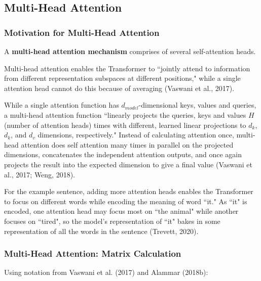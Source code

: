 \subsection{Multi-Head Attention}

\subsubsection{Motivation for Multi-Head Attention}


A \textbf{multi-head attention mechanism} comprises of several self-attention heads. 

Multi-head attention enables the Transformer to ``jointly attend to information from different representation subspaces at different positions," while a single attention head cannot do this because of averaging (Vaswani et al., 2017). 

While a single attention function has $d_{model}$-dimensional keys, values and queries, a multi-head attention function ``linearly projects the queries, keys and values $H$ (number of attention heads) times with different, learned linear projections to $d_k$, $d_k$, and $d_v$ dimensions, respectively." Instead of calculating attention once, multi-head attention does self attention many times in parallel on the projected dimensions, concatenates the independent attention outputs, and once again projects the result into the expected dimension to give a final value (Vaswani et al., 2017; Weng, 2018). 

For the example sentence, adding more attention heads enables the Transformer to focus on different words while encoding the meaning of word ``it." As ``it" is encoded, one attention head may focus most on ``the animal" while another focuses on ``tired", so the model's representation of ``it" bakes in some representation of all the words in the sentence (Trevett, 2020). 

\subsubsection{Multi-Head Attention: Matrix Calculation}

Using notation from Vaswani et al. (2017) and Alammar (2018b): 

